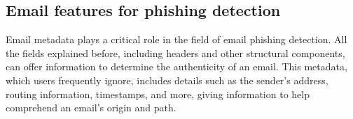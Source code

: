 


\begin{comment}
The EML (Email) is a common format for all types of email software. We can think of the
EML file as a file generated after the email is archived, retaining the original HTML format and title, and so forth. The basis of our detection system is the EML file, which provides us with large email-related information. Fortunately, most mail systems provide a window to download EML files directly. Besides, when the user logs in to the mailbox client, the EML file is automatically downloaded to the local.
Each EML file has a standard format, which allows it to load by specified rules. In the EML file, some of the information is base64 encrypted, so it needs to be decrypted to get the rawest data. In the process of extracting, the email file that missing field values will be considered abnormal data and be discarded.
\end{comment}

\subsection{Email features for phishing detection}


Email metadata plays a critical role in the field of email phishing detection. All the fields explained before, including headers and other structural components, can offer information to determine the authenticity of an email. This metadata, which users frequently ignore, includes details such as the sender's address, routing information, timestamps, and more, giving information to help comprehend an email's origin and path.

